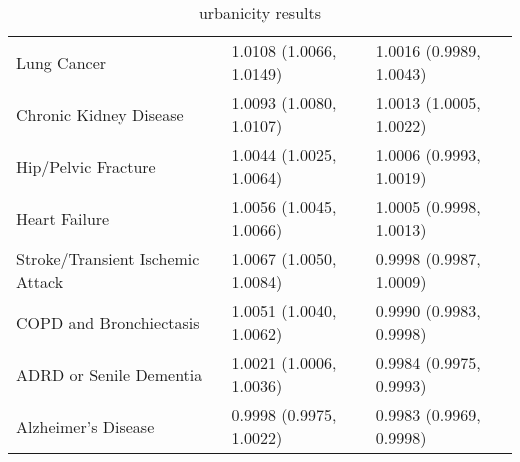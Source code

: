 \begin{table}[ht]
\begin{tabular}{lll}
  Lung Cancer & 1.0108 (1.0066, 1.0149) & 1.0016 (0.9989, 1.0043) \\ 
  Chronic Kidney Disease & 1.0093 (1.0080, 1.0107) & 1.0013 (1.0005, 1.0022) \\ 
  Hip/Pelvic Fracture & 1.0044 (1.0025, 1.0064) & 1.0006 (0.9993, 1.0019) \\ 
  Heart Failure & 1.0056 (1.0045, 1.0066) & 1.0005 (0.9998, 1.0013) \\ 
  Stroke/Transient Ischemic Attack & 1.0067 (1.0050, 1.0084) & 0.9998 (0.9987, 1.0009) \\ 
  COPD and Bronchiectasis & 1.0051 (1.0040, 1.0062) & 0.9990 (0.9983, 0.9998) \\ 
  ADRD or Senile Dementia & 1.0021 (1.0006, 1.0036) & 0.9984 (0.9975, 0.9993) \\ 
  Alzheimer's Disease & 0.9998 (0.9975, 1.0022) & 0.9983 (0.9969, 0.9998) \\ 
   \hline
\end{tabular}
\caption{urbanicity results} 
\label{tab:stratified_OR_urban}
\end{table}
